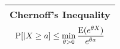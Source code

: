 
{\tabulinesep=1mm
\begin{tabu}{|p{16cm} |}
\hline
\vspace{2 mm}
\textbf{Chernoff's Inequality } \newline
\[\text{P}[|X \geq a] \leq \min_{\theta > 0} \frac{\text{E}(e^{\theta X})}{e^{\theta a}}\]
\vspace{2 mm}
\\
\hline
\end{tabu}
}